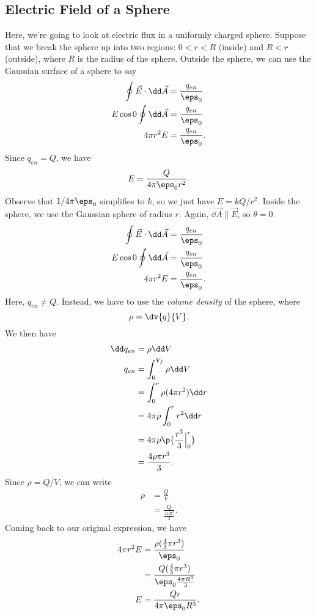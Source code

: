 \documentclass[11pt]{article}
\begin{document}
\subsection{Electric Field of a Sphere}
Here, we're going to look at electric flux in a uniformly charged sphere. Suppose that we break the sphere up into two regions: $0 < r < R$ (inside) and $R < r$ (outside), where $R$ is the radius of the sphere. Outside the sphere, we can use the Gaussian surface of a sphere to say
\begin{align*}
	\oint \vec{E} \cdot \dd \vec{A} &= \frac{q_{en}}{\eps_0} \\
	E\cos0\oint \dd \vec{A} &= \frac{q_{en}}{\eps_0} \\
	4\pi r^2E &= \frac{q_{en}}{\eps_0}.
\end{align*}
Since $q_{en} = Q$, we have
\[E = \frac{Q}{4\pi\eps_0 r^2}.\]
Observe that $1/4\pi\eps_0$ simplifies to $k$, so we just have $E = kQ/r^2$. Inside the sphere, we use the Gaussian sphere of radius $r$. Again, $\dd\vec{A} \parallel \vec{E}$, so $\theta = 0$.
\begin{align*}
	\oint \vec{E} \cdot \dd \vec{A} &= \frac{q_{en}}{\eps_0} \\
	E\cos0\oint\dd \vec{A} &= \frac{q_{en}}{\eps_0} \\
	4\pi r^2E &= \frac{q_{en}}{\eps_0}.
\end{align*}
Here, $q_{en} \neq Q$. Instead, we have to use the \textit{volume density} of the sphere, where
\[\rho = \dv{q}{V}.\]
We then have
\begin{align*}
	\dd q_{en} &= \rho\dd V \\
	q_{en} &= \int_0^{V_f} \rho \dd V \\
	&= \int_0^r\rho (4\pi r^2) \dd r \\
	&= 4\pi\rho\int_0^r r^2\dd r \\
	&= 4\pi\rho\p{\frac{r^3}{3}\Big|_0^r} \\
	&= \frac{4\rho\pi r^3}{3}.
\end{align*}
Since $\rho = Q/V$, we can write
\begin{align*}
	\rho &= \frac{Q}{V} \\
	&= \frac{Q}{\frac{4\pi R^3}{3}}.	
\end{align*}
Coming back to our original expression, we have
\begin{align*}
	4\pi r^2E &= \frac{\rho(\frac{4}{3}\pi r^3)}{\eps_0} \\
	&= \frac{Q(\frac{4}{3}\pi r^3)}{\eps_0\frac{4\pi R^3}{3}} \\
	E &= \frac{Qr}{4\pi\eps_0R^3}.
\end{align*}
\end{document}
